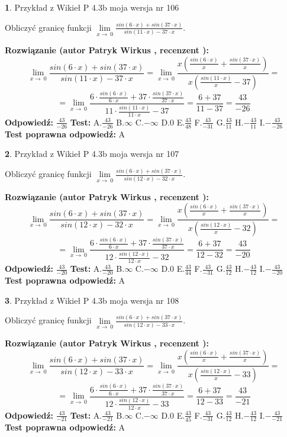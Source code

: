 \documentclass[12pt, a4paper]{article}
\theoremstyle{definition} %
\newtheorem{zad}{}
\newcommand{\zadStart}[1]{\begin{zad}#1\newline}
\newcommand{\zadStop}{\end{zad}}
\newcommand{\rozwStart}[2]{\noindent \textbf{Rozwiązanie (autor #1 , recenzent #2): }\newline}
\newcommand{\rozwStop}{\newline}
\newcommand{\odpStart}{\noindent \textbf{Odpowiedź:}\newline}
\newcommand{\odpStop}{\newline}
\newcommand{\testStart}{\noindent \textbf{Test:}\newline}
\newcommand{\testStop}{\newline}
\newcommand{\kluczStart}{\noindent \textbf{Test poprawna odpowiedź:}\newline}
\newcommand{\kluczStop}{\newline}
\begin{document}
\zadStart{Przykład z Wikieł P 4.3b moja wersja nr 106}


Obliczyć granicę funkcji $\lim\limits_{x\to\ 0}\frac{sin(6 \cdot x)+sin(37 \cdot x)}{sin(11 \cdot x)-37 \cdot x}$.
\zadStop
\rozwStart{Patryk Wirkus}{}
$$\lim\limits_{x\to\ 0}\frac{sin(6 \cdot x)+sin(37 \cdot x)}{sin(11 \cdot x)-37 \cdot x}=\lim\limits_{x\to\ 0}\frac{x(\frac{sin(6 \cdot x)}{x}+\frac{sin(37 \cdot x)}{x})}{x(\frac{sin(11 \cdot x)}{x}-37)}=$$
$$=\lim\limits_{x\to\ 0}\frac{6 \cdot \frac{sin(6 \cdot x)}{6 \cdot x}+37 \cdot \frac{sin(37 \cdot x)}{37 \cdot x}}{11 \cdot \frac{sin(11 \cdot x)}{11 \cdot x}-37}=\frac{6+37}{11-37} = \frac{43}{-26}$$
\rozwStop
\odpStart
$\frac{43}{-26}$
\odpStop
\testStart
A.$\frac{43}{-26}$
B.$\infty$
C.$-\infty$
D.$0$
E.$\frac{43}{48}$
F.$\frac{43}{-31}$
G.$\frac{43}{11}$
H.$-\frac{43}{11}$
I.$-\frac{43}{-26}$
\testStop
\kluczStart
A
\kluczStop



\zadStart{Przykład z Wikieł P 4.3b moja wersja nr 107}


Obliczyć granicę funkcji $\lim\limits_{x\to\ 0}\frac{sin(6 \cdot x)+sin(37 \cdot x)}{sin(12 \cdot x)-32 \cdot x}$.
\zadStop
\rozwStart{Patryk Wirkus}{}
$$\lim\limits_{x\to\ 0}\frac{sin(6 \cdot x)+sin(37 \cdot x)}{sin(12 \cdot x)-32 \cdot x}=\lim\limits_{x\to\ 0}\frac{x(\frac{sin(6 \cdot x)}{x}+\frac{sin(37 \cdot x)}{x})}{x(\frac{sin(12 \cdot x)}{x}-32)}=$$
$$=\lim\limits_{x\to\ 0}\frac{6 \cdot \frac{sin(6 \cdot x)}{6 \cdot x}+37 \cdot \frac{sin(37 \cdot x)}{37 \cdot x}}{12 \cdot \frac{sin(12 \cdot x)}{12 \cdot x}-32}=\frac{6+37}{12-32} = \frac{43}{-20}$$
\rozwStop
\odpStart
$\frac{43}{-20}$
\odpStop
\testStart
A.$\frac{43}{-20}$
B.$\infty$
C.$-\infty$
D.$0$
E.$\frac{43}{44}$
F.$\frac{43}{-31}$
G.$\frac{43}{12}$
H.$-\frac{43}{12}$
I.$-\frac{43}{-20}$
\testStop
\kluczStart
A
\kluczStop



\zadStart{Przykład z Wikieł P 4.3b moja wersja nr 108}


Obliczyć granicę funkcji $\lim\limits_{x\to\ 0}\frac{sin(6 \cdot x)+sin(37 \cdot x)}{sin(12 \cdot x)-33 \cdot x}$.
\zadStop
\rozwStart{Patryk Wirkus}{}
$$\lim\limits_{x\to\ 0}\frac{sin(6 \cdot x)+sin(37 \cdot x)}{sin(12 \cdot x)-33 \cdot x}=\lim\limits_{x\to\ 0}\frac{x(\frac{sin(6 \cdot x)}{x}+\frac{sin(37 \cdot x)}{x})}{x(\frac{sin(12 \cdot x)}{x}-33)}=$$
$$=\lim\limits_{x\to\ 0}\frac{6 \cdot \frac{sin(6 \cdot x)}{6 \cdot x}+37 \cdot \frac{sin(37 \cdot x)}{37 \cdot x}}{12 \cdot \frac{sin(12 \cdot x)}{12 \cdot x}-33}=\frac{6+37}{12-33} = \frac{43}{-21}$$
\rozwStop
\odpStart
$\frac{43}{-21}$
\odpStop
\testStart
A.$\frac{43}{-21}$
B.$\infty$
C.$-\infty$
D.$0$
E.$\frac{43}{45}$
F.$\frac{43}{-31}$
G.$\frac{43}{12}$
H.$-\frac{43}{12}$
I.$-\frac{43}{-21}$
\testStop
\kluczStart
A
\kluczStop
\end{document}
